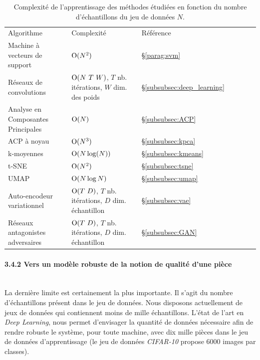 \begin{table}[bhtp]
	\centering
	\begin{tabular}{|l|l|l|l|l|l|l|}
		\arrayrulecolor{black}
		\hhline{---}
		Algorithme  & Complexité & Référence\\
		\hhline{=:=:=:} %
		Machine à vecteurs de support      & $\operatorname{O}(N^2)$        & §\ref{parag:svm} \\ \hline
		Réseaux de convolutions & $\bigO(N \ T \ W)$, $T$ nb. itérations, $W$ dim. des poids & §\ref{subsubsec:deep_learning}\\
		\hhline{=:=:=:} %
		Analyse en Composantes Principales & $\operatorname{O}(N)$          & §\ref{subsubsec:ACP}\\ \hline
		ACP à noyau                        & $\operatorname{O}(N^3)$        & §\ref{subsubsec:kpca}\\
		\hhline{=:=:=:}
		k-moyennes                         & $\operatorname{O}(N \log(N))$  & §\ref{subsubsec:kmeans} \\ \hline
		t-SNE                              & $\operatorname{O}(N^2)$        & §\ref{subsubsec:tsne}\\ \hline
		UMAP                               & $\operatorname{O}(N \log N)$   & §\ref{subsubsec:umap}\\ \hline
		Auto-encodeur variationnel        & $\bigO(T \ D)$, $T$ nb. itérations, $D$ dim. échantillon  & §\ref{subsubsec:vae}\\ \hline
		Réseaux antagonistes adversaires   & $\bigO(T \ D)$, $T$ nb. itérations, $D$ dim. échantillon & §\ref{subsubsec:GAN}\\ \hline
	\end{tabular}
	\caption{Complexité de l'apprentissage des méthodes étudiées en fonction du nombre d'échantillons du jeu de données $N$.}
	\label{tab:overview}
\end{table}

\paragraph{3.4.2 Vers un modèle robuste de la notion de qualité d'une pièce} \mbox{} \\
La dernière limite est certainement la plus importante.
Il s'agit du nombre d'échantillons présent dans le jeu de données.
Nous disposons actuellement de jeux de données qui contiennent moins de mille échantillons.
L’état de l’art en \textit{Deep Learning}, nous permet d’envisager la quantité de données nécessaire afin de rendre robuste le système, pour toute machine, avec dix mille pièces dans le jeu de données d’apprentissage (le jeu de données \textit{CIFAR-10} \cite{krizhevsky2009learning} propose 6000 images par classes).


